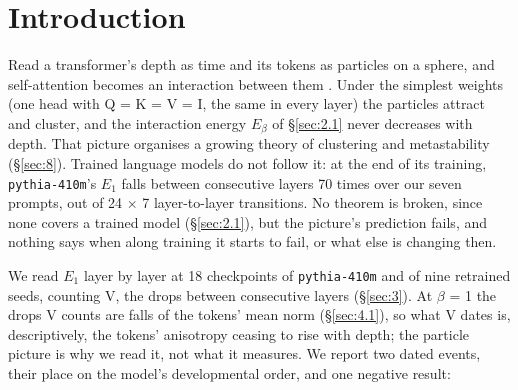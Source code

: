 \documentclass[11pt]{article}
\begin{document}
\section{Introduction}\label{sec:1}

Read a transformer's depth as time and its tokens as particles on a sphere, and self-attention becomes an interaction between them \citep{geshkovski2023}. Under the simplest weights (one head with Q = K = V = I, the same in every layer) the particles attract and cluster, and the interaction energy $E_\beta $ of \S\ref{sec:2.1} never decreases with depth. That picture organises a growing theory of clustering and metastability (\S\ref{sec:8}). Trained language models do not follow it: at the end of its training, \texttt{pythia-410m}'s $E_{1}$ falls between consecutive layers 70 times over our seven prompts, out of 24 $\times $ 7 layer-to-layer transitions. No theorem is broken, since none covers a trained model (\S\ref{sec:2.1}), but the picture's prediction fails, and nothing says when along training it starts to fail, or what else is changing then.

We read $E_{1}$ layer by layer at 18 checkpoints of \texttt{pythia-410m} and of nine retrained seeds, counting V, the drops between consecutive layers (\S\ref{sec:3}). At $\beta $ = 1 the drops V counts are falls of the tokens' mean norm (\S\ref{sec:4.1}), so what V dates is, descriptively, the tokens' anisotropy ceasing to rise with depth; the particle picture is why we read it, not what it measures. We report two dated events, their place on the model's developmental order, and one negative result:
\end{document}
